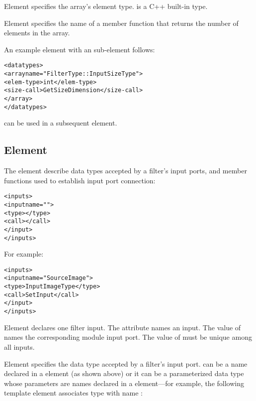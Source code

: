 Element  specifies the array's element type.
 is a C++ built-in type.

Element  specifies the name of a member
function that returns the number of elements in the array.

An example  element with an 
sub-element follows:

\begin{alltt}
  <datatypes>
    <array name="FilterType::InputSizeType">
      <elem-type>int</elem-type>
      <size-call>GetSizeDimension</size-call>
    </array>
  </datatypes>
\end{alltt}

 can be used in a subsequent
 element.


\subsection{Element }
\label{sec:itk_mods:inputs_element}

The  element describe data types accepted by a
filter's input ports, and member functions used to
establish input port connection:

\begin{alltt}
  <inputs>
    <input name="">
      <type></type>
      <call></call>
    </input>
    \velide
  </inputs>
\end{alltt}

For example:

\begin{alltt}
  <inputs>
    <input name="SourceImage">
      <type>InputImageType</type>
      <call>SetInput</call>
    </input>
  </inputs>
\end{alltt}

Element  declares one filter input.
The  attribute names an input.  The value of
 names the corresponding \sr{} module input port.
The value of  must be unique among all inputs.

Element  specifies the data type accepted by a
filter's input port.   can be a name
declared in a  element (as shown above) or it
can be a parameterized data type whose parameters are names declared
in a  element---for example, the following
template element associates type  with name
: 

